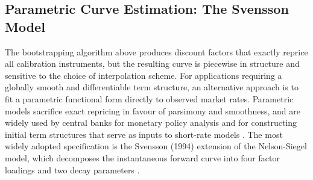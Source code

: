     \subsection*{Parametric Curve Estimation: The Svensson Model}

    \noindent
    The bootstrapping algorithm above produces discount factors that exactly reprice all calibration instruments, but the resulting curve is piecewise in structure and sensitive to the choice of interpolation scheme. For applications requiring a globally smooth and differentiable term structure, an alternative approach is to fit a parametric functional form directly to observed market rates. Parametric models sacrifice exact repricing in favour of parsimony and smoothness, and are widely used by central banks for monetary policy analysis and for constructing initial term structures that serve as inputs to short-rate models \cite{bis2005zerocoupon}. The most widely adopted specification is the Svensson (1994) extension of the Nelson-Siegel model, which decomposes the instantaneous forward curve into four factor loadings and two decay parameters \cite{svensson1994estimating}.

